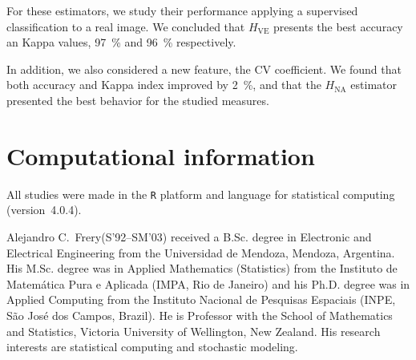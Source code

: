 \documentclass[journal]{IEEEtran}
\begin{document}
For these estimators, we study their performance applying a supervised classification to a real image. We concluded that $H_{\text{VE}}$ presents the best accuracy an Kappa values, \SI{97}{\percent} and \SI{96}{\percent} respectively. 

In addition, we also considered a new feature, the CV coefficient. We found that both accuracy and Kappa index improved by \SI{2}{\percent}, and that the $H_{\text{NA}}$ estimator presented the best behavior for the studied measures.

\section{Computational information}
\label{conclusion}

All studies were made in the \texttt R platform and language for statistical computing~\cite{RLanguage} (version~4.0.4).




\begin{IEEEbiography}{Alejandro C.\ Frery}(S'92--SM'03)
	received a B.Sc. degree in Electronic and Electrical Engineering from the Universidad de Mendoza, Mendoza, Argentina.
	His M.Sc. degree was in Applied Mathematics (Statistics) from the Instituto de Matem\'atica Pura e Aplicada (IMPA, Rio de Janeiro) and his Ph.D. degree was in Applied Computing from the Instituto Nacional de Pesquisas Espaciais (INPE, S\~ao Jos\'e dos Campos, Brazil).
	He is Professor with the School of Mathematics and Statistics, Victoria University of Wellington, New Zealand.
	His research interests are statistical computing and stochastic modeling.
\end{IEEEbiography}
\end{document}
